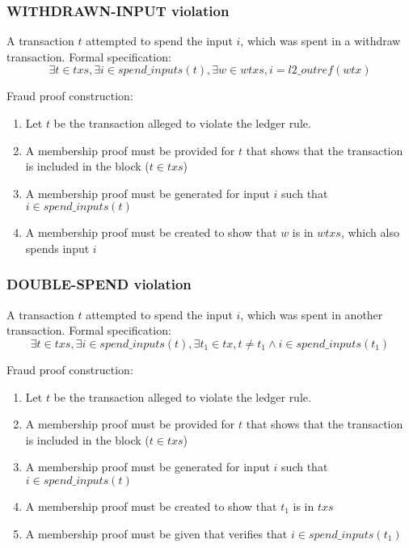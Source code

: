 \documentclass[../midgard.tex]{subfiles}
\begin{document}
\subsubsection{WITHDRAWN-INPUT violation}
\label{violation:WITHDRAWN-INPUT}
A transaction $t$ attempted to spend the input $i$, which was spent in a withdraw transaction.
Formal specification:
\begin{equation*}
    \exists t \in txs, \exists i \in spend\_inputs(t), \exists w \in wtxs, i = l2\_outref(wtx)
\end{equation*}

Fraud proof construction:
\begin{enumerate}
  \item Let $t$ be the transaction alleged to violate the ledger rule. 
  \item A membership proof must be provided for $t$ that shows that the transaction is included in the block ($t \in txs$)
  \item A membership proof must be generated for input $i$ such that $i \in spend\_inputs(t)$
  \item A membership proof must be created to show that $w$ is in $wtxs$, which also spends input $i$
\end{enumerate}

\subsubsection{DOUBLE-SPEND violation}
\label{violation:DOUBLE-SPEND}
A transaction $t$ attempted to spend the input $i$, which was spent in another transaction.
Formal specification:
\begin{equation*}
    \exists t \in txs, \exists i \in spend\_inputs(t), \exists t_1 \in tx, t \neq t_1 \land i \in spend\_inputs(t_1)
\end{equation*}

Fraud proof construction:
\begin{enumerate}
  \item Let $t$ be the transaction alleged to violate the ledger rule. 
  \item A membership proof must be provided for $t$ that shows that the transaction is included in the block ($t \in txs$)
  \item A membership proof must be generated for input $i$ such that $i \in spend\_inputs(t)$
  \item A membership proof must be created to show that $t_1$ is in $txs$
  \item A membership proof must be given that verifies that $i \in spend\_inputs(t_1)$
\end{enumerate}
\end{document}
